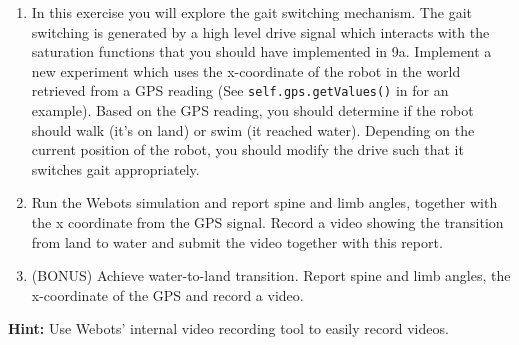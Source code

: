 \documentclass{cmc}
\begin{document}
\begin{enumerate}
\item In this exercise you will explore the gait switching mechanism. The gait
  switching is generated by a high level drive signal which interacts with the
  saturation functions that you should have implemented in 9a. Implement a new
  experiment which uses the x-coordinate of the robot in the world retrieved
  from a GPS reading (See \texttt{self.gps.getValues()} in
   for an example). Based on the GPS reading,
  you should determine if the robot should walk (it’s on land) or swim (it
  reached water). Depending on the current position of the robot, you should
  modify the drive such that it switches gait appropriately.
\item Run the Webots simulation and report spine and limb angles, together with
  the x coordinate from the GPS signal. Record a video showing the transition
  from land to water and submit the video together with this report.
\item (BONUS) Achieve water-to-land transition. Report spine and limb angles,
  the x-coordinate of the GPS and record a video.
\end{enumerate}


\textbf{Hint:} Use Webots’ internal video recording tool to easily record
videos.



\newpage


\label{sec:references}




\end{document}
